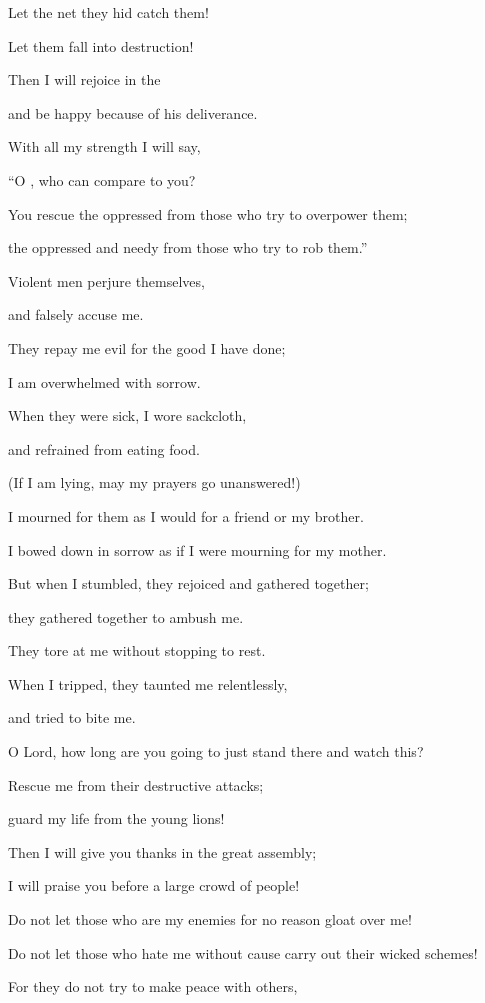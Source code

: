 {\par }{\Q Let the net
they hid
catch
them!
\par }{\Q Let them fall
into destruction!
\par }{\Q {}Then I
will rejoice
in the
{}
\par }{\Q and be happy
because of his deliverance.
\par }{\Q {}With all
my strength
I will say,
\par }{\Q “O
{}, who
can compare
to you?
\par }{\Q You rescue
the oppressed
from
those who try to overpower
them;

\par }{\Q the oppressed
and needy
from those who try to rob them.”
\par }{\Q {}Violent
men perjure
themselves,

\par }{\Q and falsely
accuse me.
\par }{\Q {}They repay
me evil
for
the good
I have done;

\par }{\Q I am overwhelmed
with sorrow.
\par }{\Q {}When they were sick,
I
wore
sackcloth,
\par }{\Q and refrained from eating food.
\par }{\Q (If I
am lying, may my prayers
go unanswered!)
\par }{\Q {}I mourned for them as I would for a friend
or my brother.
\par }{\Q I bowed down
in sorrow
as if I were mourning
for my mother.
\par }{\Q {}But when I stumbled,
they rejoiced
and gathered together;
\par }{\Q they gathered together
to ambush me.

\par }{\Q They tore
at me without
stopping to rest.
\par }{\Q {}When I tripped, they taunted
me relentlessly,

\par }{\Q and tried to bite me.
\par }{\Q {}O Lord,
how long
are you going to just stand there and watch
this?

\par }{\Q Rescue
me
from their destructive attacks;
\par }{\Q guard my life
from the young lions!
\par }{\Q {}Then I will give you thanks
in the great
assembly;
\par }{\Q I will praise
you before a large crowd
of people!
\par }{\Q {}Do not
let those who are my enemies
for no reason
gloat
over me!
\par }{\Q Do not let those who hate
me without cause
carry out their wicked schemes!
\par }{\Q {}For
they do not
try to make
peace
with others,

}
